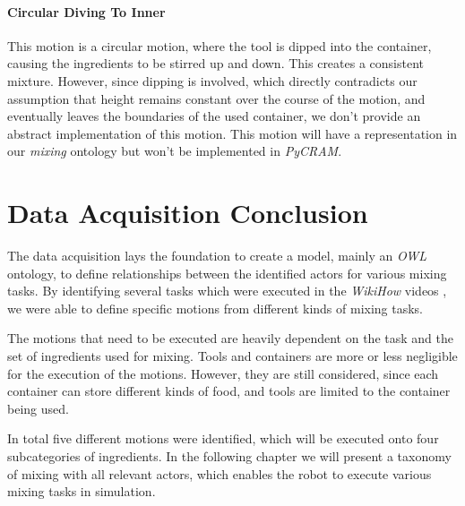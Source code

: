 \paragraph{Circular Diving To Inner}
This motion is a circular motion, where the tool is dipped into the container, causing the ingredients to be stirred up and down.
This creates a consistent mixture. However, since dipping is involved, 
which directly contradicts our assumption that height remains constant over the course of the motion, and eventually leaves the boundaries of the used container, 
we don't provide an abstract implementation of this motion. This motion will have a representation in our \textit{mixing} ontology but won't be implemented in \textit{PyCRAM}.


\section{Data Acquisition Conclusion}
The data acquisition lays the foundation to create a model, mainly an \textit{OWL} ontology, to define relationships between the identified actors for various mixing tasks.
By identifying several tasks which were executed in the \textit{WikiHow} videos \cite{wikihow}, we were able to define specific motions from different 
kinds of mixing tasks. 

The motions that need to be executed are heavily dependent on the task and the set of ingredients used for mixing.
Tools and containers are more or less negligible for the execution of the motions. 
However, they are still considered, since each container can store different kinds of food, and tools are limited to the container being used.

In total five different motions were identified, which will be executed onto four subcategories of ingredients. 
In the following chapter we will present a taxonomy of mixing with all relevant actors, which enables the robot to execute various mixing tasks in simulation. 
\newpage